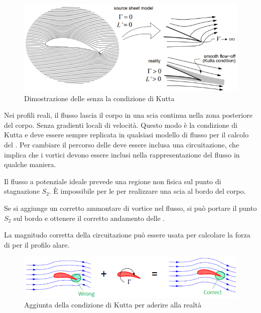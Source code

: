 \begin{figure}
\centering
\includegraphics[width = \textwidth]{gfx/NoKutta}
\caption{Dimostrazione delle  senza la condizione di Kutta}
\label{fig:NoKutta}
\end{figure} 

Nei profili reali, il flusso lascia il corpo in una scia continua nella zona posteriore del corpo. Senza gradienti locali di velocità. Questo modo è la condizione di Kutta e deve essere sempre replicata in qualsiasi modello di flusso per il calcolo del .
Per cambiare il percorso delle  deve essere inclusa una circuitazione, che implica che i vortici devono essere inclusi nella rappresentazione del flusso in qualche maniera.

Il flusso a potenziale ideale prevede una regione non fisica sul punto di stagnazione $S_2$.
È impossibile per le  per realizzare una scia al bordo del corpo.

Se si aggiunge un corretto ammontare di vortice nel flusso, si può portare il punto $S_2$ sul bordo e ottenere il corretto andamento delle .

La magnitudo corretta della circuitazione può essere usata per calcolare la forza di  per il profilo alare.

\begin{figure}
\centering
\includegraphics[width = \textwidth]{gfx/AggiuntaCircuitazione}
\caption{Aggiunta della condizione di Kutta per aderire alla realtà}
\label{fig:AggiuntaKutta}
\end{figure}

